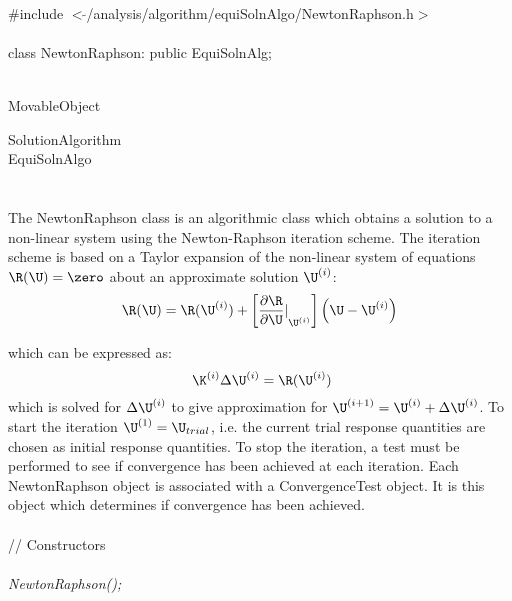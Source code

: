 
   \\
\indent \#include $<\tilde{
}$/analysis/algorithm/equiSolnAlgo/NewtonRaphson.h$>$  \\ 

  \\
class NewtonRaphson: public EquiSolnAlg;  


 \\
MovableObject 

\indent\indent SolutionAlgorithm \\
\indent\indent\indent EquiSolnAlgo \\
\indent\indent\indent{} \\

 \\ 
\indent The NewtonRaphson class is an algorithmic class which obtains a
solution to a non-linear system using the Newton-Raphson iteration
scheme. The iteration scheme is based on a Taylor expansion of the
non-linear system of equations $\R(\U) = \zero$ about an approximate
solution $\U^{(i)}$:
\begin{equation} 
\R(\U) = 
\R(\U^{(i)}) +
\left[ {\frac{\partial \R}{\partial \U} \vert}_{\U^{(i)}}\right]
\left( \U - \U^{(i)} \right) 
\end{equation}

\noindent which can be expressed as:
\begin{equation} \
\K^{(i)}  \Delta \U^{(i)} = \R(\U^{(i)})
\end{equation}
which is solved for $\Delta \U^{(i)}$ to give approximation for
$\U^{(i+1)} = \U^{(i)} + \Delta \U^{(i)}$. To start the
iteration $\U^{(1)} = \U_{trial}$, i.e. the current trial
response quantities are chosen as initial response quantities. 
To stop the iteration, a test must be performed to see if convergence
has been achieved at each iteration. Each NewtonRaphson object is
associated with a ConvergenceTest object. It is this object which
determines if convergence has been achieved. \\

 \\ 
\indent // Constructors \\ 
\\ 
{\em NewtonRaphson();}\\ 

